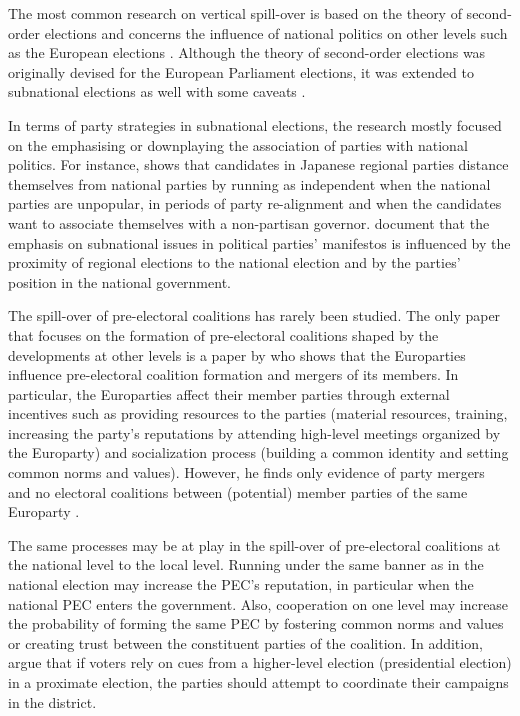 \documentclass[]{interact}
\theoremstyle{plain}%
\theoremstyle{definition}
\theoremstyle{remark}
\begin{document}
The most common research on vertical spill-over is based on the theory of second-order elections and concerns the influence of national politics on other levels such as the European elections \citep{reif1980}. Although the theory of second-order elections was originally devised for the European Parliament elections, it was extended to subnational elections as well with some caveats \citep[see e.g.][]{heath1999, schakel2013}. 

In terms of party strategies in subnational elections, the research mostly focused on the emphasising or downplaying the association of parties with national politics. For instance, \citet{hijino2021} shows that candidates in Japanese regional parties distance themselves from national parties by running as independent when the national parties are unpopular, in periods of party re-alignment and when the candidates want to associate themselves with a non-partisan governor. \citet{gross2022} document that the emphasis on subnational issues in political parties' manifestos is influenced by the proximity of regional elections to the national election and by the parties' position in the national government.

The spill-over of pre-electoral coalitions has rarely been studied. The only paper that focuses on the formation of pre-electoral coalitions shaped by the developments at other levels is a paper by \citet{ibenskas2020} who shows that the Europarties influence pre-electoral coalition formation and mergers of its members. In particular, the Europarties affect their member parties through external incentives such as providing resources to the parties (material resources, training, increasing the party's reputations by attending high-level meetings organized by the Europarty) and socialization process (building a common identity and setting common norms and values). However, he finds only evidence of party mergers and no electoral coalitions between (potential) member parties of the same Europarty \citep{ibenskas2020}.

The same processes may be at play in the spill-over of pre-electoral coalitions at the national level to the local level. Running under the same banner as in the national election may increase the PEC's reputation, in particular when the national PEC enters the government. Also, cooperation on one level may increase the probability of forming the same PEC by fostering common norms and values or creating trust between the constituent parties of the coalition. In addition, \citet{hicken2011} argue that if voters rely on cues from a higher-level election (presidential election) in a proximate election, the parties should attempt to coordinate their campaigns in the district.
\end{document}
